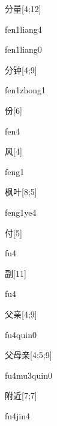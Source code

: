 \begin{verbete}{分量}[4;12]
\begin{pronuncia}{fen1liang4}
\end{pronuncia}
\begin{pronuncia}{fen1liang0}
\end{pronuncia}
\end{verbete}

\begin{verbete}{分钟}[4;9]
\begin{pronuncia}{fen1zhong1}
\end{pronuncia}
\end{verbete}

\begin{verbete}[fen4]{份}[6]
\begin{pronuncia}{fen4}
\end{pronuncia}
\end{verbete}

\begin{verbete}[feng1]{风}[4]
\begin{pronuncia}{feng1}
\end{pronuncia}
\end{verbete}

\begin{verbete}[feng1ye4]{枫叶}[8;5]
\begin{pronuncia}{feng1ye4}
\end{pronuncia}
\end{verbete}

\begin{verbete}[fu4]{付}[5]
\begin{pronuncia}{fu4}
\end{pronuncia}
\end{verbete}

\begin{verbete}[fu4]{副}[11]
\begin{pronuncia}{fu4}
\end{pronuncia}
\end{verbete}

\begin{verbete}[fu4qin0]{父亲}[4;9]
\begin{pronuncia}{fu4quin0}
\end{pronuncia}
\end{verbete}

\begin{verbete}[fu4mu3qin0]{父母亲}[4;5;9]
\begin{pronuncia}{fu4mu3quin0}
\end{pronuncia}
\end{verbete}

\begin{verbete}[fu4jin4]{附近}[7;7]
\begin{pronuncia}{fu4jin4}
\end{pronuncia}
\end{verbete}

